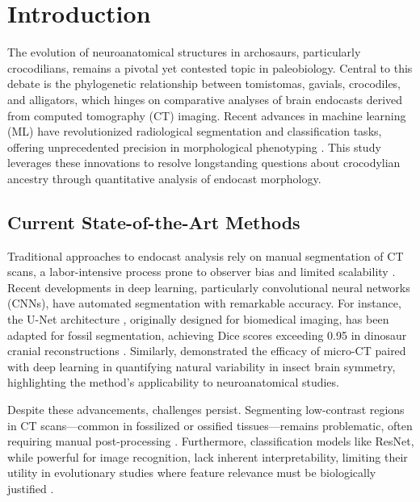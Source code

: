 \chapter{Introduction} 
The evolution of neuroanatomical structures in archosaurs, particularly crocodilians, remains a pivotal yet contested topic in paleobiology. Central to this debate is the phylogenetic relationship between tomistomas, gavials, crocodiles, and alligators, which hinges on comparative analyses of brain endocasts derived from computed tomography (CT) imaging. Recent advances in machine learning (ML) have revolutionized radiological segmentation and classification tasks, offering unprecedented precision in morphological phenotyping \cite{Yu_2022}. This study leverages these innovations to resolve longstanding questions about crocodylian ancestry through quantitative analysis of endocast morphology.  

\section{Current State-of-the-Art Methods}  
Traditional approaches to endocast analysis rely on manual segmentation of CT scans, a labor-intensive process prone to observer bias and limited scalability \cite{Yu_2022}. Recent developments in deep learning, particularly convolutional neural networks (CNNs), have automated segmentation with remarkable accuracy. For instance, the U-Net architecture \cite{Ronneberger_2015}, originally designed for biomedical imaging, has been adapted for fossil segmentation, achieving Dice scores exceeding 0.95 in dinosaur cranial reconstructions \cite{Yu_2022, Knutsen_2024}. Similarly, \cite{L_sel_2023} demonstrated the efficacy of micro-CT paired with deep learning in quantifying natural variability in insect brain symmetry, highlighting the method’s applicability to neuroanatomical studies.  

Despite these advancements, challenges persist. Segmenting low-contrast regions in CT scans—common in fossilized or ossified tissues—remains problematic, often requiring manual post-processing \cite{Knutsen_2024}. Furthermore, classification models like ResNet, while powerful for image recognition, lack inherent interpretability, limiting their utility in evolutionary studies where feature relevance must be biologically justified \cite{Selvaraju_2017}.  

